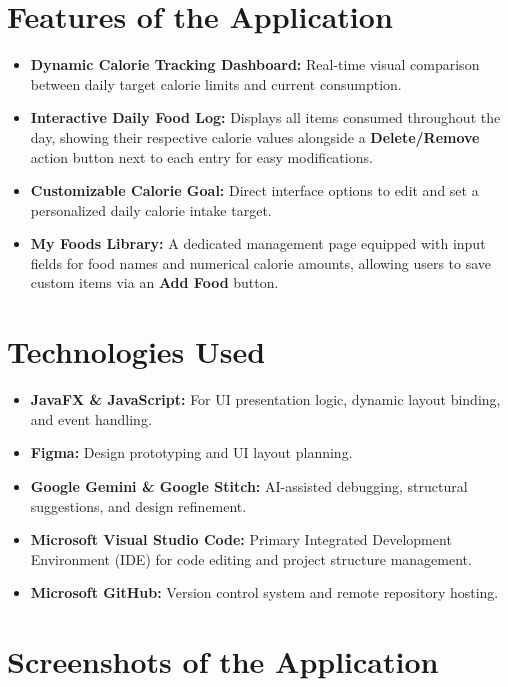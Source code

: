 \documentclass{article}
\begin{document}
\section{Features of the Application}
\begin{itemize}[leftmargin=*]
    \item \textbf{Dynamic Calorie Tracking Dashboard:} Real-time visual comparison between daily target calorie limits and current consumption.
    \item \textbf{Interactive Daily Food Log:} Displays all items consumed throughout the day, showing their respective calorie values alongside a \textbf{Delete/Remove} action button next to each entry for easy modifications.
    \item \textbf{Customizable Calorie Goal:} Direct interface options to edit and set a personalized daily calorie intake target.
    \item \textbf{My Foods Library:} A dedicated management page equipped with input fields for food names and numerical calorie amounts, allowing users to save custom items via an \textbf{Add Food} button.
\end{itemize}

\section{Technologies Used}
\begin{itemize}[leftmargin=*]
    \item \textbf{JavaFX \& JavaScript:} For UI presentation logic, dynamic layout binding, and event handling.
    \item \textbf{Figma:} Design prototyping and UI layout planning.
    \item \textbf{Google Gemini \& Google Stitch:} AI-assisted debugging, structural suggestions, and design refinement.
    \item \textbf{Microsoft Visual Studio Code:} Primary Integrated Development Environment (IDE) for code editing and project structure management.
    \item \textbf{Microsoft GitHub:} Version control system and remote repository hosting.
\end{itemize}

\section{Screenshots of the Application}
\end{document}
